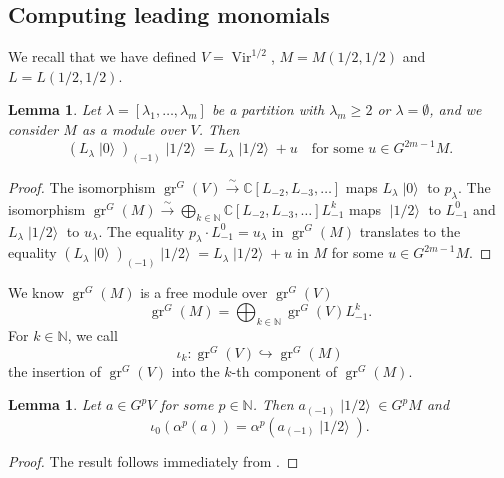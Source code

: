 \documentclass[a4paper, 12pt, reqno]{amsart}
\newtheorem{lemma}[theorem]{Lemma}
\theoremstyle{remark}
\DeclareMathOperator{\Vir}{Vir}
\DeclareMathOperator{\gr}{gr}
\DeclareMathOperator{\vac}{|0\rangle}
\DeclareMathOperator{\vachalf}{|1/2\rangle}
\begin{document}
\subsection{Computing leading monomials}
\label{sec:comp-lead-monom}

We recall that we have defined $V = \Vir^{1/2}$, $M = M(1/2, 1/2)$ and $L = L(1/2, 1/2)$.

\begin{lemma}
  \label{lmm:34}
  Let $\lambda = [\lambda_1, \dots, \lambda_m]$ be a partition with $\lambda_m \ge 2$ or $\lambda = \emptyset$, and we consider $M$ as a module over $V$.
  Then
  \begin{equation*}
    (L_{\lambda}\vac)_{(-1)}\vachalf = L_{\lambda}\vachalf + u \quad \text{for some $u \in G^{2m - 1}M$}.
  \end{equation*}
\end{lemma}

\begin{proof}
  The isomorphism $\gr^G(V) \xrightarrow{\sim} \mathbb{C}[L_{-2}, L_{-3}, \dots]$ maps $L_{\lambda}\vac$ to $p_{\lambda}$.
  The isomorphism $\gr^G(M) \xrightarrow{\sim} \bigoplus_{k \in \mathbb{N}}\mathbb{C}[L_{-2}, L_{-3}, \dots]L_{-1}^k$ maps $\vachalf$ to $L_{-1}^0$ and $L_{\lambda}\vachalf$ to $u_{\lambda}$.
  The equality $p_{\lambda}\cdot L_{-1}^0 = u_{\lambda}$ in $\gr^G(M)$ translates to the equality $(L_{\lambda}\vac)_{(-1)}\vachalf = L_{\lambda}\vachalf + u$ in $M$ for some $u \in G^{2m - 1}M$.
\end{proof}

We know $\gr^G(M)$ is a free module over $\gr^G(V)$
\begin{equation*}
  \gr^G(M) = \bigoplus_{k \in \mathbb{N}}\gr^G(V)L_{-1}^k.
\end{equation*}
For $k \in \mathbb{N}$, we call
\begin{equation*}
  \iota_k: \gr^G(V) \hookrightarrow \gr^G(M)
\end{equation*}
the insertion of $\gr^G(V)$ into the $k$-th component of $\gr^G(M)$.

\begin{lemma}
  \label{lmm:35}
  Let $a \in G^pV$ for some $p \in \mathbb{N}$.
  Then $a_{(-1)}\vachalf \in G^pM$ and
  \begin{equation*}
    \iota_0(\alpha^p(a)) = \alpha^p(a_{(-1)}\vachalf).
  \end{equation*}
\end{lemma}

\begin{proof}
  The result follows immediately from .
\end{proof}
\end{document}
